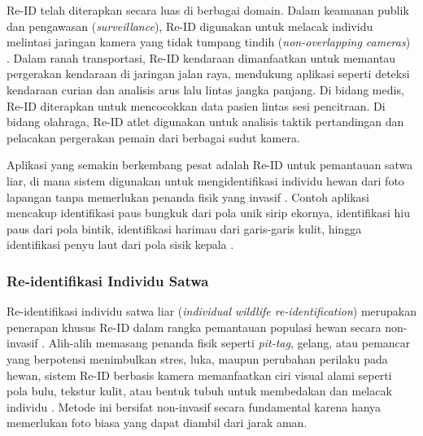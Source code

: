  
Re-ID telah diterapkan secara luas di berbagai domain. Dalam keamanan publik dan pengawasan (\textit{surveillance}), Re-ID digunakan untuk melacak individu melintasi jaringan kamera yang tidak tumpang tindih (\textit{non-overlapping cameras}) \cite{zheng2015scalable}. Dalam ranah transportasi, Re-ID kendaraan dimanfaatkan untuk memantau pergerakan kendaraan di jaringan jalan raya, mendukung aplikasi seperti deteksi kendaraan curian dan analisis arus lalu lintas jangka panjang. Di bidang medis, Re-ID diterapkan untuk mencocokkan data pasien lintas sesi pencitraan. Di bidang olahraga, Re-ID atlet digunakan untuk analisis taktik pertandingan dan pelacakan pergerakan pemain dari berbagai sudut kamera.
 
Aplikasi yang semakin berkembang pesat adalah Re-ID untuk pemantauan satwa liar, di mana sistem digunakan untuk mengidentifikasi individu hewan dari foto lapangan tanpa memerlukan penanda fisik yang invasif \cite{cermak2024wildlifedatasets}. Contoh aplikasi mencakup identifikasi paus bungkuk dari pola unik sirip ekornya, identifikasi hiu paus dari pola bintik, identifikasi harimau dari garis-garis kulit, hingga identifikasi penyu laut dari pola sisik kepala \cite{adam2023seaturtleid2022}.

\subsubsection{Re-identifikasi Individu Satwa}
 
Re-identifikasi individu satwa liar (\textit{individual wildlife re-identification}) merupakan penerapan khusus Re-ID dalam rangka pemantauan populasi hewan secara non-invasif \cite{schneider2020deep}. Alih-alih memasang penanda fisik seperti \textit{pit-tag}, gelang, atau pemancar yang berpotensi menimbulkan stres, luka, maupun perubahan perilaku pada hewan, sistem Re-ID berbasis kamera memanfaatkan ciri visual alami seperti pola bulu, tekstur kulit, atau bentuk tubuh untuk membedakan dan melacak individu \cite{clapham2021perspectives}. Metode ini bersifat non-invasif secara fundamental karena hanya memerlukan foto biasa yang dapat diambil dari jarak aman.
 
